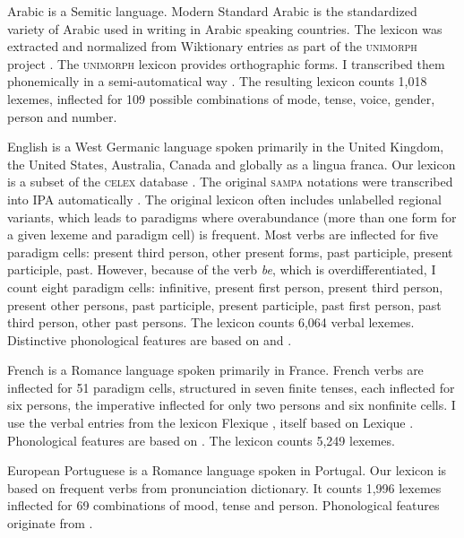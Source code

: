 \documentclass[output=paper]{langscibook}
\begin{document}
    Arabic is a Semitic language. Modern Standard Arabic is the standardized variety of Arabic used in writing in Arabic speaking countries. The lexicon was extracted and normalized from Wiktionary entries as part of the \textsc{unimorph} project \citep{KirovSylak-GlassmanQueYarowsky2016}. The \textsc{unimorph} lexicon provides orthographic forms. I transcribed them phonemically in a semi-automatical way \citep[for more details, see][]{BeniaminePhd}. The resulting lexicon counts 1,018 lexemes, inflected for 109 possible combinations of mode, tense, voice, gender, person and number.

    English is a West Germanic language spoken primarily in the United Kingdom, the United States, Australia, Canada and globally as a lingua franca. Our lexicon is a subset of the \textsc{celex} database \citep{BaayenPiepenbrockGulikers1995}. The original \textsc{sampa} notations were transcribed into IPA automatically \citep{BeniaminePhd}. The original lexicon often includes unlabelled regional variants, which leads to paradigms where overabundance (more than one form for a given lexeme and paradigm cell) is frequent. Most verbs are inflected for five paradigm cells: present third person, other present forms, past participle, present participle, past. However, because of the verb \textit{be}, which is overdifferentiated, I count eight paradigm cells: infinitive, present first person, present third person, present other persons, past participle, present participle, past first person, past third person, other past persons. The lexicon counts 6,064 verbal lexemes. Distinctive phonological features are based on \citet{HalleClements1983} and \citet{ChomskyHalle1968}.

    French is a Romance language spoken primarily in France. French verbs are inflected for 51 paradigm cells, structured in seven finite tenses, each inflected for six persons, the imperative inflected for only two persons and six nonfinite cells. I use the verbal entries from the lexicon Flexique \citep{BonamiCaronPlancq2014}, itself based on Lexique \citep{NewPallierFerrandMatos2001}. Phonological features are based on \citet{Dell1973}. The lexicon counts 5,249 lexemes.

    European Portuguese is a Romance language spoken in Portugal. Our lexicon is based on frequent verbs from  pronunciation dictionary. It counts 1,996 lexemes inflected for 69 combinations of mood, tense and person. Phonological features originate from \citet{BonamiLuis2014}.
\end{document}
